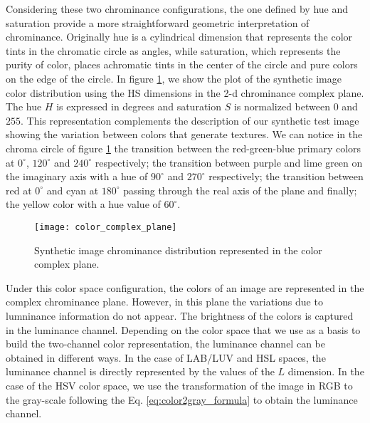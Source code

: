 Considering these two chrominance configurations, the one defined by hue and saturation provide a more straightforward geometric interpretation of chrominance. Originally hue is a cylindrical dimension that represents the color tints in the chromatic circle as angles, while saturation, which represents the purity of color, places achromatic tints in the center of the circle and pure colors on the edge of the circle. In figure \ref{fig:color_complex_plane}, we show the plot of the synthetic image color distribution using the HS dimensions in the 2-d chrominance complex plane. The hue $H$ is expressed in degrees and saturation $S$ is normalized between $0$ and $255$. This representation complements the description of our synthetic test image showing the variation between colors that generate textures. We can notice in the chroma circle of figure \ref{fig:color_complex_plane} the transition between the red-green-blue primary colors at $0^\circ$, $120^\circ$ and $240^\circ$ respectively; the transition between purple and lime green on the imaginary axis with a hue of $90^\circ$ and $270^\circ$ respectively; the transition between red at $0^\circ$ and cyan at $180^\circ$ passing through the real axis of the plane and finally; the yellow color with a hue value of $60^\circ$.

\begin{figure}[!ht]
	\centering
    \texttt{[image: color\_complex\_plane]}
	\caption{Synthetic image chrominance distribution represented in the color complex plane.}\label{fig:color_complex_plane}
\end{figure}

Under this color space configuration, the colors of an image are represented in the complex chrominance plane. However, in this plane the variations due to lumninance information do not appear. The brightness of the colors is captured in the luminance channel. Depending on the color space that we use as a basis to build the two-channel color representation, the luminance channel can be obtained in different ways. In the case of LAB/LUV and HSL spaces, the luminance channel is directly represented by the values of the $L$ dimension. In the case of the HSV color space, we use the transformation of the image in RGB to the gray-scale following the Eq. \eqref{eq:color2gray_formula} to obtain the luminance channel.

